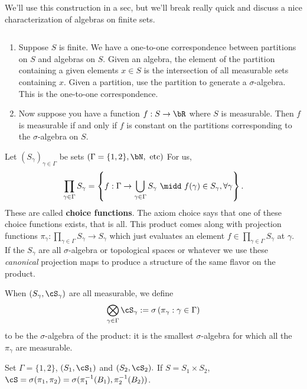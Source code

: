 We'll use this construction in a sec, but we'll break really quick and discuss a nice characterization of algebras on finite sets.

\begin{example}\label{example:algebras-are-partitions-finite}
  $ $
  \begin{enumerate}
    \item Suppose $S$ is finite. We have a one-to-one correspondence between partitions on $S$ and algebras on $S$. Given an algebra, the element of the partition containing a given elements $x \in S$ is the intersection of all measurable sets containing $x$. Given a partition, use the partition to generate a $\sigma$-algebra. This is the one-to-one correspondence.
    \item Now suppose you have a function $f:S\to \bR$ where $S$ is measurable. Then $f$ is measurable if and only if $f$ is constant on the partitions corresponding to the $\sigma$-algebra on $S$.
  \end{enumerate}
\end{example}

 Let $(S_\gamma)_{\gamma \in \Gamma}$ be sets $(\Gamma = \{1,2\}, \bN, \text{ etc})$
For us, 
\begin{align*}
  \prod_{\gamma \in \Gamma} S_\gamma = \left\{f:\Gamma \to \bigcup_{\gamma \in \Gamma} S_\gamma ~\midd~ f(\gamma) \in S_\gamma, \forall \gamma\right\}.
\end{align*}
These are called \textbf{choice functions}. The axiom choice says that one of these choice functions exists, that is all. This product comes along with projection functions $\pi_\gamma:\prod_{\gamma \in \Gamma} S_\gamma \to S_\gamma$ which just evaluates an element $f \in \prod_{\gamma \in \Gamma} S_\gamma$ at $\gamma$. If the $S_\gamma$ are all $\sigma$-algebra or topological spaces or whatever we use these \emph{canonical} projection maps to produce a structure of the same flavor on the product.

When $(S_\gamma,\cS_\gamma)$ are all measurable, we define
\begin{align*}
  \bigotimes_{\gamma \in \Gamma} \cS_\gamma := \sigma\left(\pi_\gamma: \gamma \in \Gamma\right)
\end{align*}
to be the $\sigma$-algebra of the product: it is the smallest $\sigma$-algebra for which all the $\pi_\gamma$ are measurable.

\begin{example}\label{example:basic-product}
  Set $\Gamma = \{1,2\}$, $(S_1,\cS_1)$ and $(S_2,\cS_2).$ If $S = S_1\times S_2$, $\cS = \sigma(\pi_1,\pi_2) = \sigma(\pi^{-1}_1(B_1),\pi_2^{-1}(B_2))$.
\end{example}

